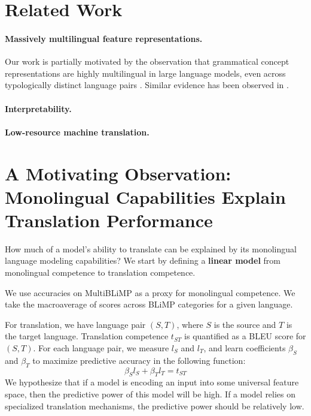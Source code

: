 \documentclass[11pt]{article}
\begin{document}
\section{Related Work}
\paragraph{Massively multilingual feature representations.} Our work is partially motivated by the observation that grammatical concept representations are highly multilingual in large language models, even across typologically distinct language pairs \citep{brinkmann-etal-2025-large}. Similar evidence has been observed in \citep{wendler-etal-2024-llamas,dumas-etal-2025-separating}.

\paragraph{Interpretability.}

\paragraph{Low-resource machine translation.} 

\section{A Motivating Observation: Monolingual Capabilities Explain Translation Performance}
How much of a model's ability to translate can be explained by its monolingual language modeling capabilities? We start by defining a \textbf{linear model} from monolingual competence to translation competence.

We use accuracies on MultiBLiMP as a proxy for monolingual competence. We take the macroaverage of scores across BLiMP categories for a given language.

For translation, we have language pair $(S, T)$, where $S$ is the source and $T$ is the target language. Translation competence $t_{ST}$ is quantified as a BLEU score for $(S, T)$. For each language pair, we measure $l_S$ and $l_T$, and learn coefficients $\beta_S$ and $\beta_T$ to maximize predictive accuracy in the following function:
\begin{equation}
    \beta_S l_S + \beta_Tl_T = t_{ST}
\end{equation}
We hypothesize that if a model is encoding an input into some universal feature space, then the predictive power of this model will be high. If a model relies on specialized translation mechanisms, the predictive power should be relatively low.
\end{document}
